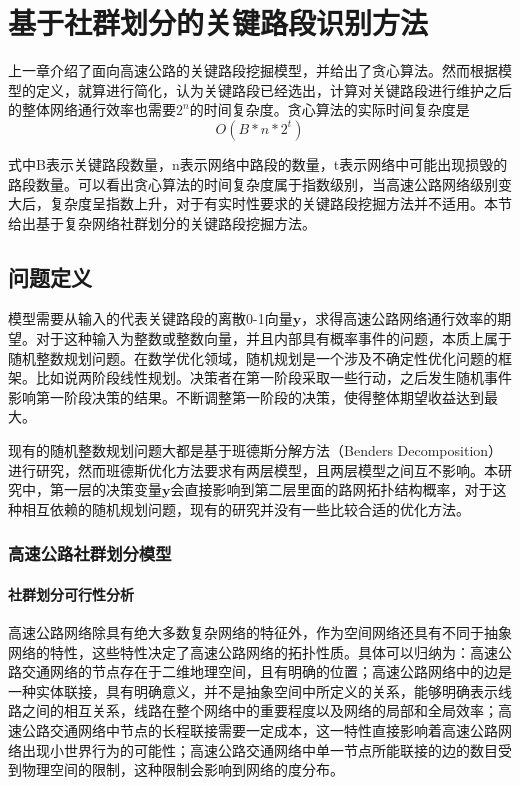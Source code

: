 
\chapter{基于社群划分的关键路段识别方法}

	上一章介绍了面向高速公路的关键路段挖掘模型，并给出了贪心算法。然而根据模型的定义，就算进行简化，认为关键路段已经选出，计算对关键路段进行维护之后的整体网络通行效率也需要$2^n$的时间复杂度。贪心算法的实际时间复杂度是
	$$O(B*n*2^t)$$

	式中B表示关键路段数量，n表示网络中路段的数量，t表示网络中可能出现损毁的路段数量。可以看出贪心算法的时间复杂度属于指数级别，当高速公路网络级别变大后，复杂度呈指数上升，对于有实时性要求的关键路段挖掘方法并不适用。本节给出基于复杂网络社群划分的关键路段挖掘方法。

	\section{问题定义}
		模型需要从输入的代表关键路段的离散0-1向量$\bm{y}$，求得高速公路网络通行效率的期望。对于这种输入为整数或整数向量，并且内部具有概率事件的问题，本质上属于随机整数规划问题。在数学优化领域，随机规划是一个涉及不确定性优化问题的框架。比如说两阶段线性规划。决策者在第一阶段采取一些行动，之后发生随机事件影响第一阶段决策的结果。不断调整第一阶段的决策，使得整体期望收益达到最大。

		现有的随机整数规划问题大都是基于班德斯分解方法（Benders Decomposition）进行研究，然而班德斯优化方法要求有两层模型，且两层模型之间互不影响。本研究中，第一层的决策变量$\bm{y}$会直接影响到第二层里面的路网拓扑结构概率，对于这种相互依赖的随机规划问题，现有的研究并没有一些比较合适的优化方法。

		\subsection{高速公路社群划分模型}

			\subsubsection{社群划分可行性分析}

			高速公路网络除具有绝大多数复杂网络的特征外，作为空间网络还具有不同于抽象网络的特性，这些特性决定了高速公路网络的拓扑性质。具体可以归纳为：高速公路交通网络的节点存在于二维地理空间，且有明确的位置；高速公路网络中的边是一种实体联接，具有明确意义，并不是抽象空间中所定义的关系，能够明确表示线路之间的相互关系，线路在整个网络中的重要程度以及网络的局部和全局效率；高速公路交通网络中节点的长程联接需要一定成本，这一特性直接影响着高速公路网络出现小世界行为的可能性；高速公路交通网络中单一节点所能联接的边的数目受到物理空间的限制，这种限制会影响到网络的度分布。

